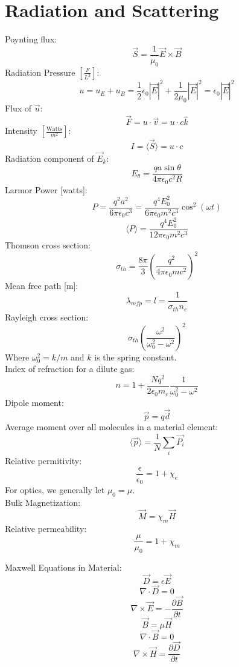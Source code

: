 \documentclass[12pt]{article}
\begin{document}
\section{Radiation and Scattering}
\noindent Poynting flux:
\[\vec{S}=\frac{1}{\mu_0}\vec{E}\times\vec{B}\]
Radiation Pressure $[\frac{F}{L^3}]$:
\[u=u_E+u_B=\frac{1}{2}\epsilon_0\left\vert\vec{E}\right\vert^2+\frac{1}{2\mu_0}\left\vert\vec{E}\right\vert^2=\epsilon_0\left\vert\vec{E}\right\vert^2\]
Flux of $\vec{u}$:
\[\vec{F}=u\cdot \vec{v}=u\cdot c\hat{k}\]
Intensity $[\frac{\text{Watts}}{m^2}]$:
\[I=\langle\vec{S}\rangle=u\cdot c\]
Radiation component of $\vec{E}_k$:
\[E_\theta=\frac{qa\sin\theta}{4\pi\epsilon_0 c^2 R}\]
Larmor Power [watts]:
\[P=\frac{q^2 a^2}{6\pi\epsilon_0 c^3}=\frac{q^4 E_0^2}{6\pi\epsilon_0 m^2 c^3} \cos^2(\omega t)\]
\[\langle P\rangle=\frac{q^4 E_0^2}{12\pi\epsilon_0 m^2 c^3}\]
Thomson cross section:
\[\sigma_{th}=\frac{8\pi}{3}\left(  \frac{q^2}{4\pi\epsilon_0 mc^2}  \right)^2\]
Mean free path [m]:
\[\lambda_{mfp}=l=\frac{1}{\sigma_{th}n_e}\]
Rayleigh cross section:
\[\sigma_{th}\left( \frac{\omega^2}{\omega_0^2-\omega^2} \right)^2\]
Where $\omega_0^2=k/m$ and $k$ is the spring constant.\\
Index of refraction for a dilute gas: 
\[n=1+\frac{Nq^2}{2\epsilon_0 m_e}\frac{1}{\omega_0^2-\omega^2}\]
Dipole moment:
\[\vec{p}=q\vec{d}\]
Average moment over all molecules in a material element:
\[\langle\vec{p}\rangle=\frac{1}{N} \sum_{i}\vec{P_i}\]
Relative permitivity:
\[\frac{\epsilon}{\epsilon_0}=1+\chi_e\]
For optics, we generally let $\mu_0=\mu$.\\
Bulk Magnetization:
\[\vec{M}=\chi_m \vec{H}\]
Relative permeability: 
\[\frac{\mu}{\mu_0}=1+\chi_m\]

\noindent Maxwell Equations in Material:
\begin{equation}
    \vec{D}=\epsilon\vec{E}
\end{equation}
\begin{equation}
    \nabla\cdot\vec{D}=0
\end{equation}
\begin{equation}
    \nabla\times\vec{E}=-\frac{\partial \vec{B}}{\partial t}
\end{equation}
\begin{equation}
    \vec{B}=\mu\vec{H}
\end{equation}
\begin{equation}
    \nabla\cdot\vec{B}=0
\end{equation}
\begin{equation}
    \nabla\times\vec{H}=\frac{\partial \vec{D}}{\partial t}
\end{equation}
\end{document}

